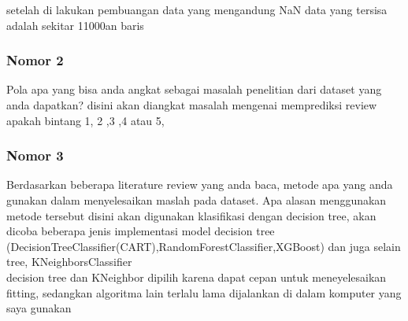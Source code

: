 \documentclass{article}
\begin{document}
setelah di lakukan pembuangan data yang mengandung NaN data yang tersisa adalah sekitar 11000an baris

\subsubsection*{Nomor 2}
Pola apa yang bisa anda angkat sebagai masalah 
penelitian dari dataset yang anda dapatkan?
\bigbreak
disini akan diangkat masalah mengenai memprediksi review apakah bintang 1, 2 ,3 ,4 atau 5, 
\subsubsection*{Nomor 3}
Berdasarkan beberapa literature review yang anda baca, 
metode apa yang anda gunakan dalam menyelesaikan maslah pada dataset. 
Apa alasan menggunakan metode tersebut
\bigbreak
disini akan digunakan klasifikasi dengan decision tree, 
akan dicoba beberapa jenis implementasi model decision tree (DecisionTreeClassifier(CART),RandomForestClassifier,XGBoost) dan juga selain tree, KNeighborsClassifier
\\
decision tree dan KNeighbor dipilih karena dapat cepan 
untuk meneyelesaikan fitting, sedangkan algoritma lain terlalu lama dijalankan di dalam komputer yang saya gunakan 
\end{document}
